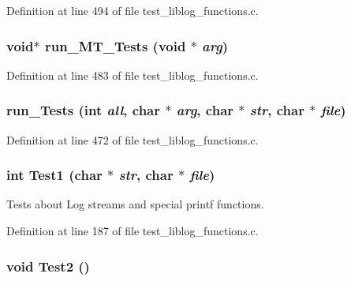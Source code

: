 Definition at line 494 of file test\_\-liblog\_\-functions.c.
\subsubsection[{run\_\-MT\_\-Tests}]{\setlength{\rightskip}{0pt plus 5cm}void$\ast$ run\_\-MT\_\-Tests (void $\ast$ {\em arg})}\label{test__liblog__functions_8c_acfdddcaa87a226c22605429c093bd940}


Definition at line 483 of file test\_\-liblog\_\-functions.c.
\subsubsection[{run\_\-Tests}]{\setlength{\rightskip}{0pt plus 5cm}run\_\-Tests (int {\em all}, \/  char $\ast$ {\em arg}, \/  char $\ast$ {\em str}, \/  char $\ast$ {\em file})}\label{test__liblog__functions_8c_ac827313e7dc6f2301502e938ac30761e}


Definition at line 472 of file test\_\-liblog\_\-functions.c.
\subsubsection[{Test1}]{\setlength{\rightskip}{0pt plus 5cm}int Test1 (char $\ast$ {\em str}, \/  char $\ast$ {\em file})}\label{test__liblog__functions_8c_a8d8822ca7051d09ff200a0a31fcab2fd}
Tests about Log streams and special printf functions. 

Definition at line 187 of file test\_\-liblog\_\-functions.c.
\subsubsection[{Test2}]{\setlength{\rightskip}{0pt plus 5cm}void Test2 ()}\label{test__liblog__functions_8c_abeb35d3301776bd3ec0f7455cef601d7}


